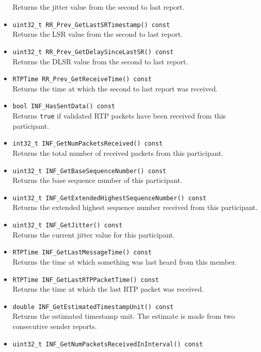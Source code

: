 \documentclass[12pt,a4paper]{article}
\begin{document}
\begin{itemize}
						Returns the jitter value from the second to last report.
					\item {\tt uint32\_t RR\_Prev\_GetLastSRTimestamp() const}\\
						Returns the LSR value from the second to last report.
					\item {\tt uint32\_t RR\_Prev\_GetDelaySinceLastSR() const}\\
						Returns the DLSR value from the second to last report.
					\item {\tt RTPTime RR\_Prev\_GetReceiveTime() const}\\
						Returns the time at which the second to last report was received.
					\item {\tt bool INF\_HasSentData() const}\\
						Returns {\tt true} if validated RTP packets have been received from this
						participant.
					\item {\tt int32\_t INF\_GetNumPacketsReceived() const}\\
						Returns the total number of received packets from this participant.
					\item {\tt uint32\_t INF\_GetBaseSequenceNumber() const}\\
						Returns the base sequence number of this participant.
					\item {\tt uint32\_t INF\_GetExtendedHighestSequenceNumber() const}\\
						Returns the extended highest sequence number received from this
						participant.
					\item {\tt uint32\_t INF\_GetJitter() const}\\
						Returns the current jitter value for this participant.
					\item {\tt RTPTime INF\_GetLastMessageTime() const}\\
						Returns the time at which something was last heard from this member.
					\item {\tt RTPTime INF\_GetLastRTPPacketTime() const}\\
						Returns the time at which the last RTP packet was received.
					\item {\tt double INF\_GetEstimatedTimestampUnit() const}\\
						Returns the estimated timestamp unit. The estimate is made from two
						consecutive sender reports.
					\item {\tt uint32\_t INF\_GetNumPacketsReceivedInInterval() const}\\

\end{itemize}
\end{document}
